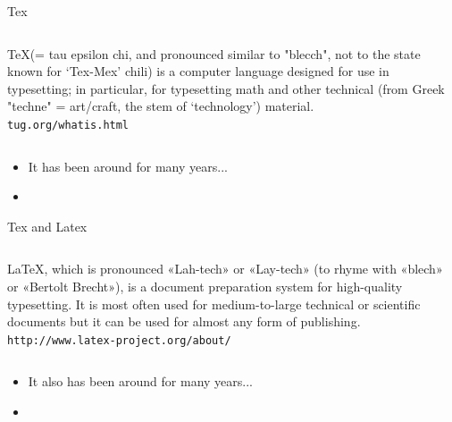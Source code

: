 \documentclass{beamer}
\begin{document}
\begin{frame}{Tex}
	\begin{center}
	\begin{columns}
	\begin{block}{}
	\begin{center}
	\TeX (= tau epsilon chi, and pronounced similar to "blecch", not to the state known for `Tex-Mex' chili) is a computer language designed for use in typesetting; in particular, for typesetting math and other technical (from Greek "techne" = art/craft, the stem of `technology') material.\\
	\texttt{tug.org/whatis.html}
	\end{center}
	\end{block}
	\end{columns}
	\end{center}
	
      \begin{itemize}
	\item It has been around for many years...
	\item 
      \end{itemize}
\end{frame}



\begin{frame}{Tex and Latex}
	\begin{center}
	\begin{columns}
	\column{.95\textwidth}
	\begin{block}{}
	\begin{center}
	\LaTeX, which is pronounced «Lah-tech» or «Lay-tech» (to rhyme with «blech» or «Bertolt Brecht»), is a document preparation system for high-quality typesetting. It is most often used for medium-to-large technical or scientific documents but it can be used for almost any form of publishing.\\
	\texttt{http://www.latex-project.org/about/}
	\end{center}
	\end{block}
	\end{columns}
	\end{center}
	
      \begin{itemize}
	\item It also has been around for many years...
	\item 
      \end{itemize}
\end{frame}
\end{document}

